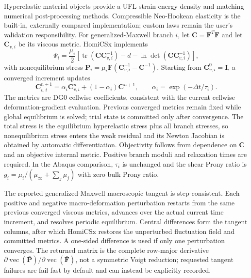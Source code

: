 \documentclass[preprint,12pt]{elsarticle}
\begin{document}
Hyperelastic material objects provide a UFL strain-energy density and matching
numerical post-processing methods. Compressible Neo-Hookean elasticity is the
built-in, externally compared implementation; custom laws remain the user's
validation responsibility. For generalized-Maxwell branch $i$, let
$\mathbf{C}=\mathbf{F}^{T}\mathbf{F}$ and let $\mathbf{C}_{v,i}$ be its viscous
metric. HomiCSx implements
\begin{equation}
\Psi_i=\frac{\mu_i}{2}\left[\operatorname{tr}(\mathbf{C}\mathbf{C}_{v,i}^{-1})
-d-\ln\det(\mathbf{C}\mathbf{C}_{v,i}^{-1})\right],
\end{equation}
with nonequilibrium stress
$\mathbf{P}_i=\mu_i\mathbf{F}(\mathbf{C}_{v,i}^{-1}-\mathbf{C}^{-1})$.
Starting from $\mathbf{C}_{v,i}^{0}=\mathbf{I}$, a converged increment updates
\begin{equation}
\mathbf{C}_{v,i}^{n+1}=\alpha_i\mathbf{C}_{v,i}^{n}
+(1-\alpha_i)\mathbf{C}^{n+1},\qquad
\alpha_i=\exp(-\Delta t/\tau_i).
\end{equation}
The metrics are DG0 cellwise coefficients, consistent with the current
cellwise deformation-gradient evaluation. Previous converged metrics remain
fixed while global equilibrium is solved; trial state is committed only after
convergence. The total stress is the equilibrium hyperelastic stress plus all
branch stresses, so nonequilibrium stress enters the weak residual and its
Newton Jacobian is obtained by automatic differentiation. Objectivity follows
from dependence on $\mathbf{C}$ and an objective internal metric. Positive
branch moduli and relaxation times are required. In the Abaqus comparison,
$\tau_i$ is unchanged and the shear Prony ratio is
$g_i=\mu_i/(\mu_{\infty}+\sum_j\mu_j)$ with zero bulk Prony ratio.

The reported generalized-Maxwell macroscopic tangent is step-consistent. Each
positive and negative macro-deformation perturbation restarts from the same
previous converged viscous metrics, advances over the actual current time
increment, and resolves periodic equilibrium. Central differences form the
tangent columns, after which HomiCSx restores the unperturbed fluctuation field
and committed metrics. A one-sided difference is used if only one perturbation
converges. The returned matrix is the complete row-major derivative
$\partial\operatorname{vec}(\bar{\mathbf{P}})/\partial\operatorname{vec}(\bar{\mathbf{F}})$,
not a symmetric Voigt reduction; requested tangent failures are fail-fast by
default and can instead be explicitly recorded.
\end{document}
